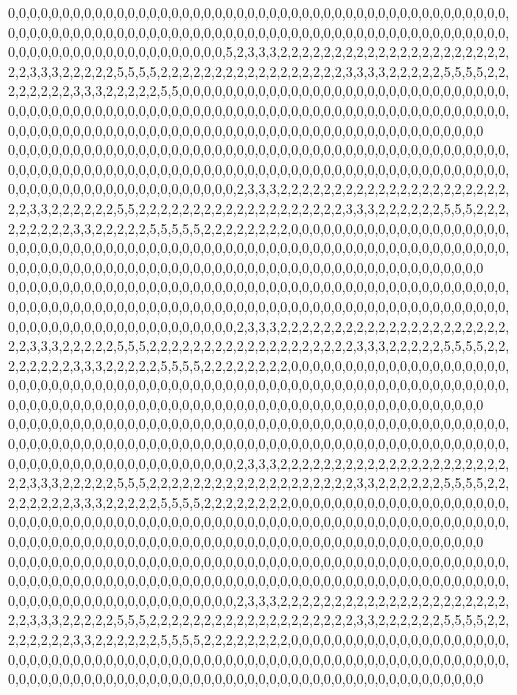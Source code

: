 0,0,0,0,0,0,0,0,0,0,0,0,0,0,0,0,0,0,0,0,0,0,0,0,0,0,0,0,0,0,0,0,0,0,0,0,0,0,0,0,0,0,0,0,0,0,0,0,0,0,0,0,0,0,0,0,0,0,0,0,0,0,0,0,0,0,0,0,0,0,0,0,0,0,0,0,0,0,0,0,0,0,0,0,0,0,0,0,0,0,0,0,0,0,0,0,0,0,0,0,0,0,0,0,0,0,0,0,0,0,0,0,5,2,3,3,3,2,2,2,2,2,2,2,2,2,2,2,2,2,2,2,2,2,2,2,2,2,2,2,3,3,3,2,2,2,2,2,5,5,5,5,2,2,2,2,2,2,2,2,2,2,2,2,2,2,2,2,2,3,3,3,3,2,2,2,2,2,5,5,5,5,2,2,2,2,2,2,2,2,3,3,3,2,2,2,2,2,5,5,0,0,0,0,0,0,0,0,0,0,0,0,0,0,0,0,0,0,0,0,0,0,0,0,0,0,0,0,0,0,0,0,0,0,0,0,0,0,0,0,0,0,0,0,0,0,0,0,0,0,0,0,0,0,0,0,0,0,0,0,0,0,0,0,0,0,0,0,0,0,0,0,0,0,0,0,0,0,0,0,0,0,0,0,0,0,0,0,0,0,0,0,0,0,0,0,0,0,0,0,0,0,0,0,0,0,0,0,0,0,0,0,0,0,0,0,0,0,0,0
0,0,0,0,0,0,0,0,0,0,0,0,0,0,0,0,0,0,0,0,0,0,0,0,0,0,0,0,0,0,0,0,0,0,0,0,0,0,0,0,0,0,0,0,0,0,0,0,0,0,0,0,0,0,0,0,0,0,0,0,0,0,0,0,0,0,0,0,0,0,0,0,0,0,0,0,0,0,0,0,0,0,0,0,0,0,0,0,0,0,0,0,0,0,0,0,0,0,0,0,0,0,0,0,0,0,0,0,0,0,0,0,0,2,3,3,3,2,2,2,2,2,2,2,2,2,2,2,2,2,2,2,2,2,2,2,2,2,2,2,3,3,2,2,2,2,2,2,5,5,2,2,2,2,2,2,2,2,2,2,2,2,2,2,2,2,2,2,2,3,3,3,2,2,2,2,2,2,5,5,5,2,2,2,2,2,2,2,2,2,3,3,2,2,2,2,2,5,5,5,5,5,2,2,2,2,2,2,2,2,0,0,0,0,0,0,0,0,0,0,0,0,0,0,0,0,0,0,0,0,0,0,0,0,0,0,0,0,0,0,0,0,0,0,0,0,0,0,0,0,0,0,0,0,0,0,0,0,0,0,0,0,0,0,0,0,0,0,0,0,0,0,0,0,0,0,0,0,0,0,0,0,0,0,0,0,0,0,0,0,0,0,0,0,0,0,0,0,0,0,0,0,0,0,0,0,0,0,0,0,0,0,0,0,0,0,0,0,0,0
0,0,0,0,0,0,0,0,0,0,0,0,0,0,0,0,0,0,0,0,0,0,0,0,0,0,0,0,0,0,0,0,0,0,0,0,0,0,0,0,0,0,0,0,0,0,0,0,0,0,0,0,0,0,0,0,0,0,0,0,0,0,0,0,0,0,0,0,0,0,0,0,0,0,0,0,0,0,0,0,0,0,0,0,0,0,0,0,0,0,0,0,0,0,0,0,0,0,0,0,0,0,0,0,0,0,0,0,0,0,0,0,0,2,3,3,3,2,2,2,2,2,2,2,2,2,2,2,2,2,2,2,2,2,2,2,2,2,2,2,3,3,3,2,2,2,2,2,5,5,5,2,2,2,2,2,2,2,2,2,2,2,2,2,2,2,2,2,2,2,3,3,3,2,2,2,2,2,5,5,5,5,2,2,2,2,2,2,2,2,3,3,3,2,2,2,2,2,5,5,5,5,2,2,2,2,2,2,2,2,0,0,0,0,0,0,0,0,0,0,0,0,0,0,0,0,0,0,0,0,0,0,0,0,0,0,0,0,0,0,0,0,0,0,0,0,0,0,0,0,0,0,0,0,0,0,0,0,0,0,0,0,0,0,0,0,0,0,0,0,0,0,0,0,0,0,0,0,0,0,0,0,0,0,0,0,0,0,0,0,0,0,0,0,0,0,0,0,0,0,0,0,0,0,0,0,0,0,0,0,0,0,0,0,0,0,0,0,0,0
0,0,0,0,0,0,0,0,0,0,0,0,0,0,0,0,0,0,0,0,0,0,0,0,0,0,0,0,0,0,0,0,0,0,0,0,0,0,0,0,0,0,0,0,0,0,0,0,0,0,0,0,0,0,0,0,0,0,0,0,0,0,0,0,0,0,0,0,0,0,0,0,0,0,0,0,0,0,0,0,0,0,0,0,0,0,0,0,0,0,0,0,0,0,0,0,0,0,0,0,0,0,0,0,0,0,0,0,0,0,0,0,0,2,3,3,3,2,2,2,2,2,2,2,2,2,2,2,2,2,2,2,2,2,2,2,2,2,2,2,3,3,3,2,2,2,2,2,5,5,5,2,2,2,2,2,2,2,2,2,2,2,2,2,2,2,2,2,2,2,3,3,2,2,2,2,2,2,5,5,5,5,2,2,2,2,2,2,2,2,3,3,3,2,2,2,2,2,5,5,5,5,2,2,2,2,2,2,2,2,0,0,0,0,0,0,0,0,0,0,0,0,0,0,0,0,0,0,0,0,0,0,0,0,0,0,0,0,0,0,0,0,0,0,0,0,0,0,0,0,0,0,0,0,0,0,0,0,0,0,0,0,0,0,0,0,0,0,0,0,0,0,0,0,0,0,0,0,0,0,0,0,0,0,0,0,0,0,0,0,0,0,0,0,0,0,0,0,0,0,0,0,0,0,0,0,0,0,0,0,0,0,0,0,0,0,0,0,0,0
0,0,0,0,0,0,0,0,0,0,0,0,0,0,0,0,0,0,0,0,0,0,0,0,0,0,0,0,0,0,0,0,0,0,0,0,0,0,0,0,0,0,0,0,0,0,0,0,0,0,0,0,0,0,0,0,0,0,0,0,0,0,0,0,0,0,0,0,0,0,0,0,0,0,0,0,0,0,0,0,0,0,0,0,0,0,0,0,0,0,0,0,0,0,0,0,0,0,0,0,0,0,0,0,0,0,0,0,0,0,0,0,0,2,3,3,3,2,2,2,2,2,2,2,2,2,2,2,2,2,2,2,2,2,2,2,2,2,2,2,3,3,3,2,2,2,2,2,5,5,5,2,2,2,2,2,2,2,2,2,2,2,2,2,2,2,2,2,2,2,3,3,2,2,2,2,2,2,5,5,5,5,2,2,2,2,2,2,2,2,3,3,2,2,2,2,2,2,5,5,5,5,2,2,2,2,2,2,2,2,0,0,0,0,0,0,0,0,0,0,0,0,0,0,0,0,0,0,0,0,0,0,0,0,0,0,0,0,0,0,0,0,0,0,0,0,0,0,0,0,0,0,0,0,0,0,0,0,0,0,0,0,0,0,0,0,0,0,0,0,0,0,0,0,0,0,0,0,0,0,0,0,0,0,0,0,0,0,0,0,0,0,0,0,0,0,0,0,0,0,0,0,0,0,0,0,0,0,0,0,0,0,0,0,0,0,0,0,0,0
